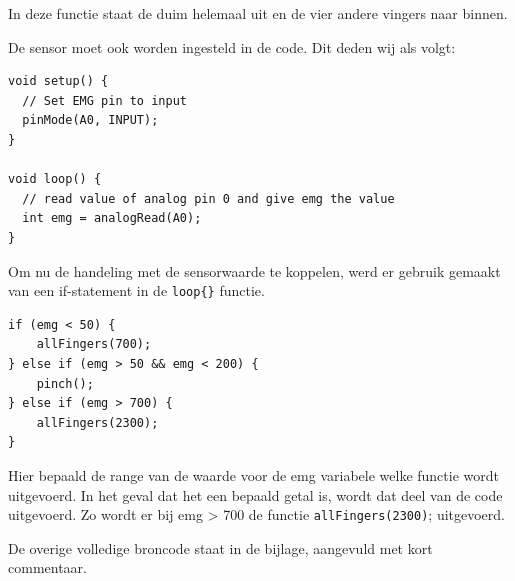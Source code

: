 In deze functie staat de duim helemaal uit en de vier andere vingers
naar binnen.

De sensor moet ook worden ingesteld in de code. Dit deden wij als volgt:

\begin{verbatim}
void setup() {
  // Set EMG pin to input
  pinMode(A0, INPUT);
}

void loop() {
  // read value of analog pin 0 and give emg the value
  int emg = analogRead(A0);
}
\end{verbatim}

Om nu de handeling met de sensorwaarde te koppelen, werd er gebruik
gemaakt van een if-statement in de \texttt{loop\{\}} functie.

\begin{verbatim}
if (emg < 50) {
    allFingers(700);
} else if (emg > 50 && emg < 200) {
    pinch();
} else if (emg > 700) {
    allFingers(2300);
}
\end{verbatim}

Hier bepaald de range van de waarde voor de emg variabele welke functie
wordt uitgevoerd. In het geval dat het een bepaald getal is, wordt dat
deel van de code uitgevoerd. Zo wordt er bij emg \textgreater{} 700 de
functie \texttt{allFingers(2300)}; uitgevoerd.

De overige volledige broncode staat in de bijlage, aangevuld met kort
commentaar.
